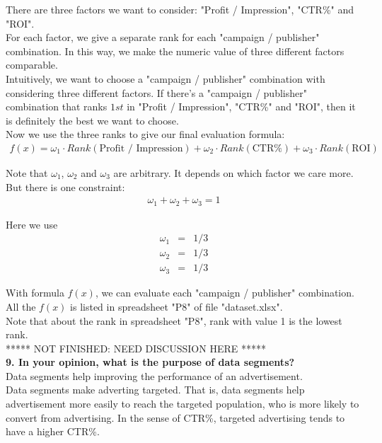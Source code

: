 \documentclass[12pt]{article}
\begin{document}
There are three factors we want to consider: "Profit / Impression", "CTR\%" and "ROI". \\

For each factor, we give a separate rank for each "campaign / publisher" combination. In this way, we make the numeric value of three different factors comparable. \\

Intuitively, we want to choose a "campaign / publisher" combination with considering three different factors. If there's a "campaign / publisher" combination that ranks $1st$ in "Profit / Impression", "CTR\%" and "ROI", then it is definitely the best we want to choose. \\

Now we use the three ranks to give our final evaluation formula:
\begin{eqnarray*}
f(x) = \omega_1 \cdot Rank(\text{Profit / Impression}) + \omega_2 \cdot Rank(\text{CTR\%}) + \omega_3 \cdot Rank(\text {ROI})
\end{eqnarray*}

Note that $\omega_1$, $\omega_2$ and $\omega_3$ are arbitrary. It depends on which factor we care more. But there is one constraint:
\begin{eqnarray*}
\omega_1 + \omega_2 + \omega_3 = 1
\end{eqnarray*}

Here we use
\begin{eqnarray*}
\omega_1 &=& 1/3 \\
\omega_2 &=& 1/3 \\
\omega_3 &=& 1/3
\end{eqnarray*}

With formula $f(x)$, we can evaluate each "campaign / publisher" combination. All the $f(x)$ is listed in spreadsheet "P8" of file "dataset.xlsx". \\

Note that about the rank in spreadsheet "P8", rank with value 1 is the lowest rank. \\

***** NOT FINISHED: NEED DISCUSSION HERE ***** \\

{\bf 9. In your opinion, what is the purpose of data segments?} \\

Data segments help improving the performance of an advertisement. \\

Data segments make adverting targeted. That is, data segments help advertisement more easily to reach the targeted population, who is more likely to convert from advertising. In the sense of CTR\%, targeted advertising tends to have a higher CTR\%. \\
\end{document}
